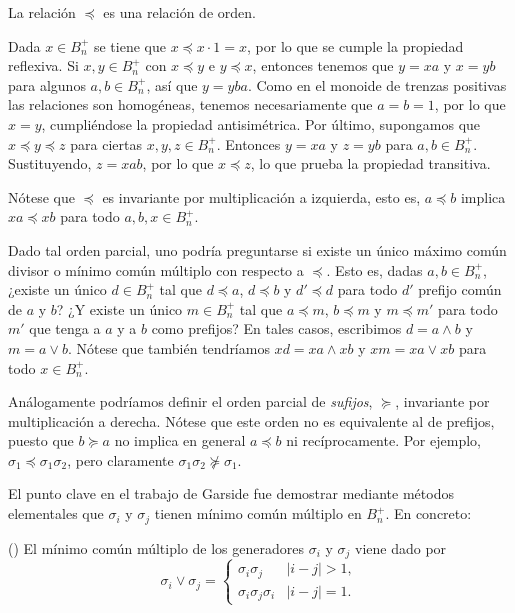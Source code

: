 \documentclass[bibtex, anon]{TEMat-article}
\begin{document}
\begin{lema}
	La relación $\preccurlyeq$ es una relación de orden.
\end{lema}
\begin{demostracion}
	Dada $x\in B_n^+$ se tiene que $x\preccurlyeq x\cdot 1=x$, por lo que se cumple la propiedad reflexiva. Si $x,y\in B_n^+$ con $x \preccurlyeq y $ e $y \preccurlyeq x$, entonces tenemos que $y=xa$ y $x=yb$ para algunos $a,b\in B_n^+$, así que $y=yba$. Como en el monoide de trenzas positivas las relaciones son homogéneas, tenemos necesariamente que $a=b=1$, por lo que $x=y$, cumpliéndose la propiedad antisimétrica. Por último, supongamos que $x\preccurlyeq y\preccurlyeq z$ para ciertas $x,y,z\in B_n^+$. Entonces $y=xa$ y $z=yb$ para $a,b\in B_n^+$. Sustituyendo, $z=xab$, por lo que $x\preccurlyeq z$, lo que prueba la propiedad transitiva. 
\end{demostracion}
Nótese que $\preccurlyeq$ es invariante por multiplicación a izquierda, esto es, $a\preccurlyeq b$ implica $xa\preccurlyeq xb$ para todo $a,b,x\in B_n^+$. %

Dado tal orden parcial, uno podría preguntarse si existe un único máximo común divisor o mínimo común múltiplo con respecto a $\preccurlyeq$. Esto es, dadas $a,b\in B_n^+$, ¿existe un único $d\in B_n^+$ tal que $d\preccurlyeq a$, $d\preccurlyeq b$ y $d'\preccurlyeq d$ para todo $d'$ prefijo común de $a$ y $b$? ¿Y existe un único $m\in B_n^+$ tal que $a\preccurlyeq m$, $b\preccurlyeq m$ y $m\preccurlyeq m'$ para todo $m'$ que tenga a $a$ y a $b$ como prefijos? En tales casos, escribimos $d=a\land b$ y $m=a\lor b$. Nótese que también tendríamos $xd=xa\land xb$ y $xm=xa\lor xb$ para todo $x\in B_n^+$.

\begin{nota}
	Análogamente podríamos definir el orden parcial de \emph{sufijos}, $\succcurlyeq$, invariante por multiplicación a derecha. Nótese que este orden no es equivalente al de prefijos, puesto que $b\succcurlyeq a$ no implica en general $a\preccurlyeq b$ ni recíprocamente. Por ejemplo, $\sigma_1\preccurlyeq \sigma_1\sigma_2$, pero claramente $\sigma_1\sigma_2\not\succcurlyeq \sigma_1$.
\end{nota}

El punto clave en el trabajo de Garside fue demostrar mediante métodos elementales que $\sigma_i$ y $\sigma_j$ tienen mínimo común múltiplo en $B_n^+$. En concreto:
\begin{proposicion}(\cite[Teorema 1.2]{Garside})
	El mínimo común múltiplo de los generadores $\sigma_i$ y $\sigma_j$ viene dado por
	$$\sigma_i\lor\sigma_j=\begin{cases}
	\sigma_i\sigma_j & |i-j|>1,\\
	\sigma_i\sigma_j\sigma_i & |i-j|=1.
	\end{cases}$$
\end{proposicion}
\end{document}
